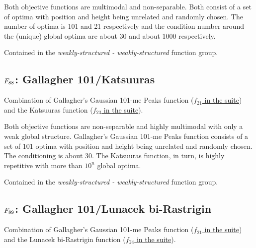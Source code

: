 Both objective functions are multimodal and non-separable. Both consist of a set of
optima with position and height being unrelated and randomly chosen. The number of
optima is 101 and 21 respectively and the condition number around the (unique) global
optima are about 30 and about 1000 respectively.

Contained in the \emph{weakly-structured - weakly-structured} function group.



\subsection[\texorpdfstring{\protect\(F_{88}\protect\): Gallagher 101/Katsuuras}{F88: Gallagher 101/Katsuuras}]{\texorpdfstring{\protect\(F_{88}\protect\): Gallagher 101/Katsuuras}{}}
\label{index:f88}\label{index:gallagher-101-katsuuras}
Combination of Gallagher’s Gaussian 101-me Peaks function (\href{https://coco.gforge.inria.fr/downloads/download16.00/bbobdocfunctions.pdf\#page=105}{\(f_{21}\) in the \bbob suite}) and the
Katsuuras function (\href{https://coco.gforge.inria.fr/downloads/download16.00/bbobdocfunctions.pdf\#page=115}{\(f_{23}\) in the \bbob suite}).

Both objective functions are non-separable and highly multimodal with
only a weak global structure. Gallagher's Gaussian 101-me Peaks
function consists of a set of 101 optima with position and height being
unrelated and randomly chosen. The conditioning is about 30.
The Katsuuras function, in turn, is highly repetitive with more than \(10^n\)
global optima.

Contained in the \emph{weakly-structured - weakly-structured} function group.



\subsection[\texorpdfstring{\protect\(F_{89}\protect\): Gallagher 101/Lunacek bi-Rastrigin}{F89: Gallagher 101/Lunacek bi-Rastrigin}]{\texorpdfstring{\protect\(F_{89}\protect\): Gallagher 101/Lunacek bi-Rastrigin}{}}
\label{index:gallagher-101-lunacek-bi-rastrigin}\label{index:f89}
Combination of Gallagher’s Gaussian 101-me Peaks function (\href{https://coco.gforge.inria.fr/downloads/download16.00/bbobdocfunctions.pdf\#page=105}{\(f_{21}\) in the \bbob suite}) and the
Lunacek bi-Rastrigin function (\href{https://coco.gforge.inria.fr/downloads/download16.00/bbobdocfunctions.pdf\#page=120}{\(f_{24}\) in the \bbob suite}).


